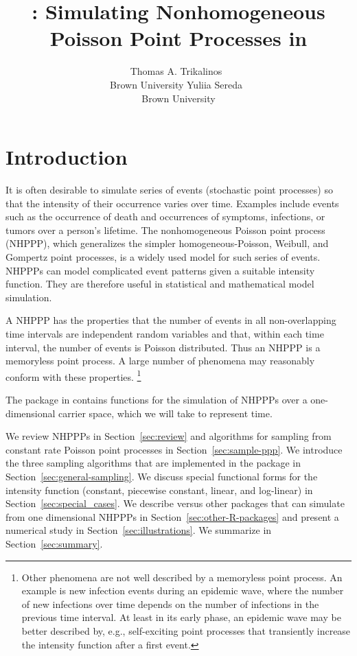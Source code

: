 \documentclass[article,nojss]{jss}\usepackage[]{graphicx}\usepackage[]{xcolor}
\author{Thomas A. Trikalinos~\orcidlink{0000-0002-3990-1848}\\Brown University
   \And Yuliia Sereda~\orcidlink{https://orcid.org/0000-0002-4017-4561}\\Brown University}
\title{\pkg{nhppp}: Simulating Nonhomogeneous Poisson Point Processes in \proglang{R}}
\begin{document}
\section{Introduction} \label{sec:intro}

It is often desirable to simulate series of events (stochastic point processes) so that the intensity of their occurrence varies over time. Examples include events such as the occurrence of death and occurrences of symptoms, infections, or tumors over a person's lifetime. The nonhomogeneous Poisson point process (NHPPP), which generalizes the simpler homogeneous-Poisson, Weibull, and Gompertz point processes, is a widely used model for such series of events. NHPPPs can model complicated event patterns given a suitable intensity function. They are therefore useful in statistical and mathematical model simulation.

A NHPPP has the properties that the number of events in all non-overlapping time intervals are independent random variables and that, within each time interval, the number of events is Poisson distributed. Thus an NHPPP is a memoryless point process. A large number of phenomena may reasonably conform with these properties.%
\footnote{Other phenomena are not well described by a memoryless point process. An example is new infection events during an epidemic wave, where the number of new infections over time depends on the number of infections in the previous time interval. At least in its early phase, an epidemic wave may be better described by, e.g., self-exciting point processes that transiently increase the intensity function after a first event.}

The  package in  contains functions for the simulation of NHPPPs over a one-dimensional carrier space, which we will take to represent time.

We review NHPPPs in Section~\ref{sec:review} and algorithms for sampling from constant rate Poisson point processes in Section~\ref{sec:sample-ppp}. We introduce the three sampling algorithms that are implemented in the package in Section~\ref{sec:general-sampling}. We discuss special functional forms for the intensity function (constant, piecewise constant, linear, and log-linear) in Section~\ref{sec:special_cases}. We describe  versus other  packages that can simulate from one dimensional NHPPPs in Section~\ref{sec:other-R-packages} and present a numerical study in Section~\ref{sec:illustrations}. We summarize in Section~\ref{sec:summary}.
\end{document}
